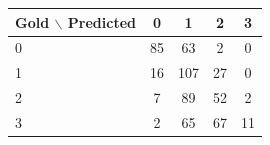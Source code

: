 \begin{tabular}{lcccc}
\toprule
Gold $\backslash$ Predicted & 0 & 1 & 2 & 3 \\
\midrule
0 & 85 & 63 & 2 & 0 \\
1 & 16 & 107 & 27 & 0 \\
2 & 7 & 89 & 52 & 2 \\
3 & 2 & 65 & 67 & 11 \\
\bottomrule
\end{tabular}